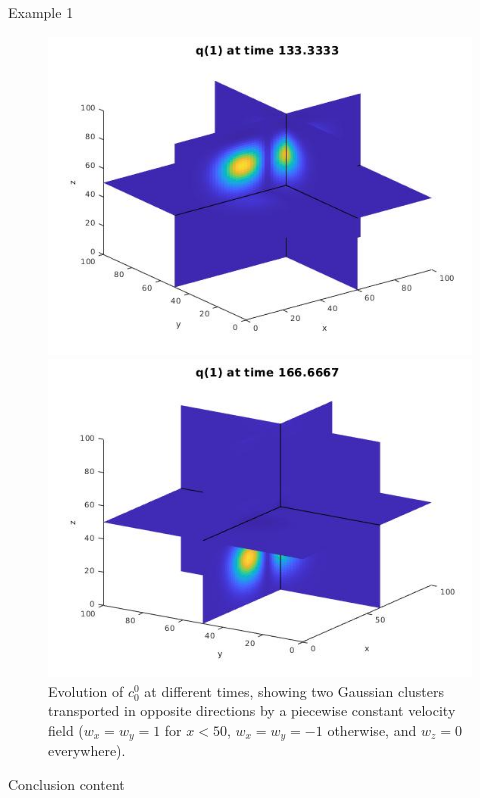 \begin{frame}{Example 1}
\begin{figure}[H]
\begin{minipage}{0.4\textwidth}
    		\end{minipage}
    	\end{figure}
    	\begin{figure}[H]
    		\centering
    		\begin{minipage}{0.4\textwidth}
    			\includegraphics[scale=0.21]{Bilder_3D/2Glocken_wxi_wyj_wzi_2Cluster_t=133}
    		\end{minipage}
    		\hfill 
    		\begin{minipage}{0.4\textwidth}
    			\includegraphics[scale=0.21]{Bilder_3D/2Glocken_wxi_wyj_wzi_2Cluster_t=166}
    		\end{minipage}
    		\caption{Evolution of $c^0_0$ at different times, showing two Gaussian clusters transported in opposite directions by a piecewise constant velocity field ($w_x=w_y=1$ for $x<50$, $w_x=w_y=-1$ otherwise, and $w_z=0$ everywhere).}
    	\end{figure}
    \end{frame}
    
    \begin{frame}{Conclusion}
 content
    \end{frame}

